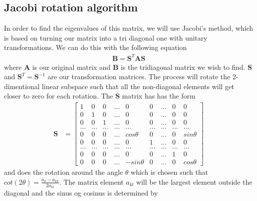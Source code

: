 \documentclass[10pt]{article}
\begin{document}
\begin{multicols}{2}
\subsection{Jacobi rotation algorithm}
In order to find the eigenvalues of this matrix, we will use Jacobi's
method, which is based on turning our matrix into a tri diagonal one with
unitary transformations. We can do this with the following equation
\begin{align*}
    \textbf{B} = \textbf{S}^T\textbf{AS}
\end{align*}
where $\textbf{A}$ is our original matrix and $\textbf{B}$ is the
tridiagonal matrix we wish to find. $\textbf{S}$ and
$\textbf{S}^T=\textbf{S}^{-1}$ are our transformation matrices. The process
will rotate the 2-dimentional linear subspace such that all the
non-diagonal elements will get closer to zero for each rotation.  The
$\textbf{S}$ matrix has has the form
\begin{align*}
    \textbf{S} &=
    \begin{bmatrix}
        1     & 0     & 0     & \dots  & 0 & 0 & \dots & 0 & 0\\
        0     & 1     & 0     & \dots  & 0 & 0 & \dots & 0 & 0\\
        0     & 0     & 1     & \dots  & 0 & 0 & \dots & 0 & 0\\
        \dots & \dots & \dots & \dots & \dots & \dots & \dots& \dots & \dots\\
        0 & 0 & 0 & \dots & cos\theta & 0 & \dots& 0 & sin\theta\\
        0     & 0 & 0 & \dots & 0 & 1 &\dots & 0 & 0\\
        \dots & \dots & \dots & \dots & \dots & \dots & \dots& \dots & \dots\\
        0     & 0 & 0 & \dots  & 0 & 0 & \dots & 1 & 0\\
        0     & 0 & 0 & \dots  & -sin\theta & 0 & \dots &  0 & cos\theta
    \end{bmatrix}
\end {align*}
and does the rotation around the angle $\theta$ which is chosen such that
$cot(2\theta) = \frac{a_{ll}-a_{kk}}{2a_{kl}}$. The matrix element $a_{kl}$
will be the largest element outside the diagonal and the sinus og cosinus
is determined by  



\end{multicols}
\end{document}
